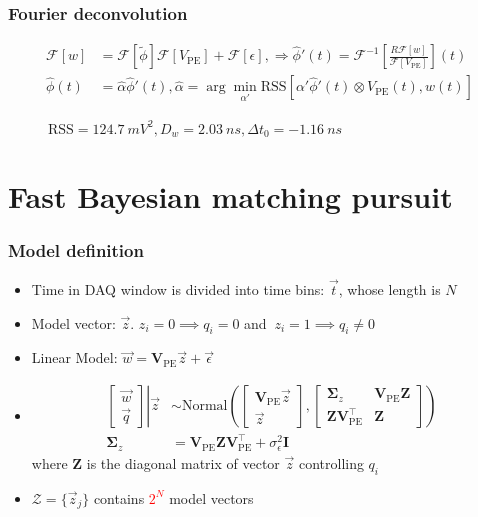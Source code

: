 \documentclass{beamer}
\begin{document}
\begin{CJK*}{UTF8}{gbsn}
\begin{frame}
\frametitle{Fourier deconvolution}
\begin{align*}
  \mathcal{F}[w] &= \mathcal{F}[\tilde{\phi}]\mathcal{F}[V_\mathrm{PE}] + \mathcal{F}[\epsilon],\Rightarrow \hat{\phi}'(t) = \mathcal{F}^{-1}\left[\frac{R \mathcal{F}[w]}{\mathcal{F}[V_\mathrm{PE}]}\right](t) \\
  \hat{\phi}(t) &= \hat{\alpha}\hat{\phi}'(t),\hat{\alpha} = \arg \underset{\alpha'}{\min}\mathrm{RSS}\left[\alpha'\hat{\phi}'(t)\otimes V_\mathrm{PE}(t),w(t)\right]
\end{align*}
\begin{figure}
    \centering
    \resizebox{0.55\textwidth}{!}{}
    \caption{$\mathrm{RSS}=\SI{124.7}{mV^2},D_w=\SI{2.03}{ns},\Delta t_0=\SI{-1.16}{ns}$}
\end{figure}
\end{frame}

\section{Fast Bayesian matching pursuit}

\begin{frame}
\frametitle{Model definition}
\begin{itemize}
    \item Time in DAQ window is divided into time bins: $\vec{t}$, whose length is $N$
    \item Model vector: $\vec{z}$. $z_i=0\implies q_i=0$ and $\ z_i=1\implies q_i\neq0$
    \item Linear Model: $\vec{w} = \bm{V}_\mathrm{PE}\vec{z} + \vec{\epsilon}$
    \item 
        \begin{align*}
            \left.
            \begin{bmatrix}
                \vec{w} \\
                \vec{q}
            \end{bmatrix}
            \right\vert\vec{z}
            &\sim \mathrm{Normal}\left(
            \begin{bmatrix}
                \bm{V}_\mathrm{PE}\vec{z} \\
                \vec{z}
            \end{bmatrix}, 
            \begin{bmatrix}
                \bm{\Sigma}_z & \bm{V}_\mathrm{PE}\bm{Z} \\
                \bm{Z}\bm{V}_\mathrm{PE}^\intercal & \bm{Z}
            \end{bmatrix}
            \right) \\
            \bm{\Sigma}_z &= \bm{V}_\mathrm{PE}\bm{Z}\bm{V}_\mathrm{PE}^\intercal+\sigma_\epsilon^2\bm{I}
        \end{align*}
    where $\bm{Z}$ is the diagonal matrix of vector $\vec{z}$ controlling $q_i$ 
    \item $\mathcal{Z}=\{\vec{z}_j\}$ contains \textcolor{red}{$2^{N}$} model vectors
\end{itemize}
\end{frame}


\end{CJK*}
\end{document}
